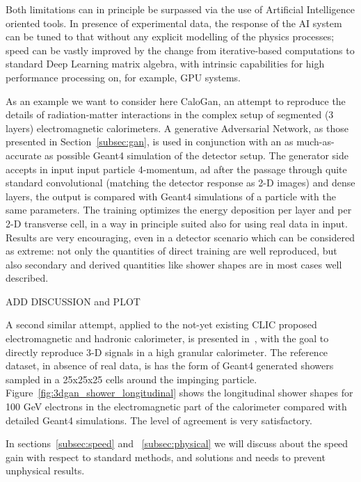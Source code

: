 Both limitations can in principle be surpassed via the use of Artificial Intelligence oriented tools.
In presence of experimental data, the response of the AI system can be tuned to that without any explicit modelling of the physics processes; speed can be vastly improved by the change from iterative-based computations to standard Deep Learning matrix algebra, with intrinsic capabilities for high performance processing on, for example, GPU systems.

As an example we want to consider here CaloGan\cite{calogan}, an attempt to reproduce the details of radiation-matter interactions in the complex setup of segmented (3 layers) electromagnetic calorimeters.
A generative Adversarial Network, as those presented in Section~\ref{subsec:gan}, is used in conjunction with an as much-as-accurate as possible Geant4 simulation of the detector setup. The generator side accepts in input input particle 4-momentum, ad after the passage through quite standard convolutional (matching the detector response as 2-D images) and dense layers, the output is compared with Geant4 simulations of a particle with the same parameters.  The training optimizes the energy deposition per layer and per 2-D transverse cell, in a way in principle suited also for using real data in input. Results are very encouraging, even in a detector scenario which can be considered as extreme: not only the quantities of direct training are well reproduced, but also secondary and derived quantities like shower shapes are in most cases well described.

ADD DISCUSSION and PLOT



A second similar attempt, applied to the not-yet existing CLIC proposed electromagnetic and hadronic calorimeter, is presented in~\cite{3dgan}, with the goal to directly reproduce 3-D signals in a high granular calorimeter. The reference dataset, in absence of real data, is has the form of Geant4 generated showers sampled in a 25x25x25 cells around the impinging particle.
Figure~\ref{fig:3dgan_shower_longitudinal} shows the longitudinal shower shapes for 100 GeV electrons in the electromagnetic part of the calorimeter compared with detailed Geant4 simulations. The level of agreement is very satisfactory.

In sections~\ref{subsec:speed} and ~\ref{subsec:physical} we will discuss about the speed gain with respect to standard methods, and solutions and needs to prevent unphysical results.


